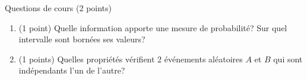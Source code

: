 \documentclass[a4paper]{article}
\newif\ifcorrection
\begin{document}
\exost Questions de cours (2 points)
\begin{enumerate} %
 \item (1 point) Quelle information apporte une mesure de probabilit\'e? Sur quel intervalle sont born\'ees ses valeurs?%
 \ifcorrection
 \textcolor{red}{~\\Une probabilit\'e donne une indication sur l'intervalle $[0;1]$ la possibilit\'e qu'un \'ev\'enement al\'eatoire
 se r\'ealise. Plus cette probabilit\'e est importante, plus l'\'ev\'enement al\'eatoire est susceptible de se r\'ealiser.}
 \fi
 \item (1 points) Quelles propri\'et\'es v\'erifient 2 \'ev\'enements al\'eatoires $A$ et $B$ qui sont ind\'ependants l'un de l'autre?
  \ifcorrection
 \textcolor{red}{2 \'ev\'enements $A$ et $B$ ind\'ependants v\'erifient $P(A|B) = \frac{P(A\cap B)}{P(B)} = \frac{P(A)P(B)}{P(B)}=P(A)$ et resp. $P(B|A)=P(B)$.}
 \fi
\end{enumerate}

\end{document}
